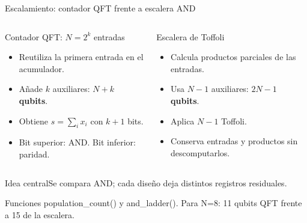 \documentclass[aspectratio=169,12pt]{beamer}
\newcommand{\fuente}[1]{\vfill{\color{gris}\tiny #1\par}}
\newcommand{\idea}[1]{\begin{alertblock}{Idea central}#1\end{alertblock}}
\begin{document}
\begin{frame}[shrink=0]{Escalamiento: contador QFT frente a escalera AND}
\begin{columns}[T,onlytextwidth]
\begin{block}{Contador QFT: $N=2^k$ entradas}
\begin{itemize}
\item Reutiliza la primera entrada en el acumulador.
\item Añade $k$ auxiliares: \textbf{$N+k$ qubits}.
\item Obtiene $s=\sum_i x_i$ con $k+1$ bits.
\item Bit superior: AND. Bit inferior: paridad.
\end{itemize}
\end{block}
\begin{block}{Escalera de Toffoli}
\begin{itemize}
\item Calcula productos parciales de las entradas.
\item Usa $N-1$ auxiliares: \textbf{$2N-1$ qubits}.
\item Aplica $N-1$ Toffoli.
\item Conserva entradas y productos sin descomputarlos.
\end{itemize}
\end{block}
\end{columns}
\idea{Se compara AND; cada diseño deja distintos registros residuales.}
\fuente{Funciones population\_count() y and\_ladder(). Para N=8: 11 qubits QFT frente a 15 de la escalera.}
\end{frame}
\end{document}
